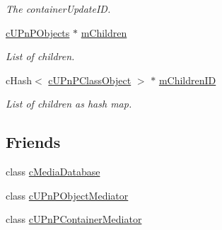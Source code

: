 \begin{CompactItemize}
\begin{CompactList}\small\item\em The containerUpdateID. \item\end{CompactList}\item 
\hypertarget{classcUPnPClassContainer_ec00054069266b3da9212e09b107a7d7}{
\hyperlink{classcUPnPObjects}{cUPnPObjects} $\ast$ \hyperlink{classcUPnPClassContainer_ec00054069266b3da9212e09b107a7d7}{mChildren}}
\label{classcUPnPClassContainer_ec00054069266b3da9212e09b107a7d7}

\begin{CompactList}\small\item\em List of children. \item\end{CompactList}\item 
\hypertarget{classcUPnPClassContainer_df514e47f80f94f957ec451e566107a5}{
cHash$<$ \hyperlink{classcUPnPClassObject}{cUPnPClassObject} $>$ $\ast$ \hyperlink{classcUPnPClassContainer_df514e47f80f94f957ec451e566107a5}{mChildrenID}}
\label{classcUPnPClassContainer_df514e47f80f94f957ec451e566107a5}

\begin{CompactList}\small\item\em List of children as hash map. \item\end{CompactList}\end{CompactItemize}
\subsection*{Friends}
\begin{CompactItemize}
\item 
\hypertarget{classcUPnPClassContainer_3d0d0aedce8b1c661ea360b9a6d616f6}{
class \hyperlink{classcUPnPClassContainer_3d0d0aedce8b1c661ea360b9a6d616f6}{cMediaDatabase}}
\label{classcUPnPClassContainer_3d0d0aedce8b1c661ea360b9a6d616f6}

\item 
\hypertarget{classcUPnPClassContainer_aefab39434a832c545ac75a79fa81d23}{
class \hyperlink{classcUPnPClassContainer_aefab39434a832c545ac75a79fa81d23}{cUPnPObjectMediator}}
\label{classcUPnPClassContainer_aefab39434a832c545ac75a79fa81d23}

\item 
\hypertarget{classcUPnPClassContainer_16cc2f01a45dc16bd9ad186b3be2cfc8}{
class \hyperlink{classcUPnPClassContainer_16cc2f01a45dc16bd9ad186b3be2cfc8}{cUPnPContainerMediator}}
\label{classcUPnPClassContainer_16cc2f01a45dc16bd9ad186b3be2cfc8}

\end{CompactItemize}


